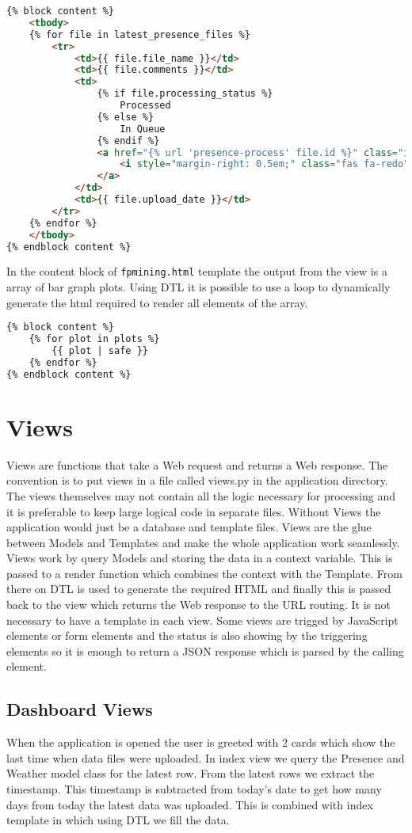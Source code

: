 \begin{lstlisting}[language={HTML}]
{% block content %}
	<tbody>
	{% for file in latest_presence_files %}
		<tr>
			<td>{{ file.file_name }}</td>
			<td>{{ file.comments }}</td>
			<td>
				{% if file.processing_status %}
					Processed
				{% else %}
					In Queue
				{% endif %}
				<a href="{% url 'presence-process' file.id %}" class="icon-block">
					<i style="margin-right: 0.5em;" class="fas fa-redo"></i>
				</a>
			</td>
			<td>{{ file.upload_date }}</td>
		</tr>
	{% endfor %}
	</tbody>
{% endblock content %}
\end{lstlisting}

In the content block of \texttt{fpmining.html} template the output from the view is a array of bar graph plots. Using DTL
it is possible to use a loop to dynamically generate the html required to render all elements of the array.

\begin{lstlisting}[language={HTML}]
{% block content %}
	{% for plot in plots %}
		{{ plot | safe }}
	{% endfor %}
{% endblock content %}
\end{lstlisting}

\section{Views}
\label{sec:views}
Views are functions that take a Web request and returns a Web response. The convention is to put views 
in a file called views.py in the application directory. The views themselves may not contain all the logic necessary for processing
and it is preferable to keep large logical code in separate files. Without Views the application would just be a database and template files.
Views are the glue between Models and Templates and make the whole application work seamlessly. Views work by query Models and storing the 
data in a context variable. This is passed to a render function which combines the context with the Template. From there on DTL is used to
generate the required HTML and finally this is passed back to the view which returns the Web response to the URL routing. It is not necessary
to have a template in each view. Some views are trigged by JavaScript elements or form elements and the status is also showing by the triggering
elements so it is enough to return a JSON response which is parsed by the calling element.

\subsection{Dashboard Views}
When the application is opened the user is greeted with 2 cards which show the last time when data files were uploaded.
In index view we query the Presence and Weather model class for the latest row. From the latest rows we extract the timestamp.
This timestamp is subtracted from today's date to get how many days from today the latest data was uploaded. This is combined with
index template in which using DTL we fill the data.

